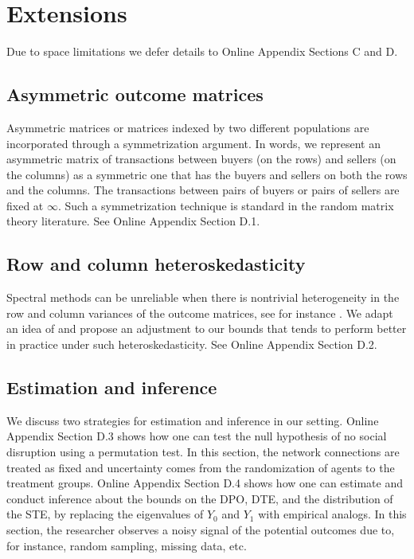 \documentclass[12pt]{article}
\theoremstyle{definition}
\begin{document}
\section{Extensions}
Due to space limitations we defer details to Online Appendix Sections C and D.   

\subsection{Asymmetric outcome matrices}
Asymmetric matrices or matrices indexed by two different populations are incorporated through a symmetrization argument. In words, we represent an asymmetric matrix of transactions between buyers (on the rows) and sellers (on the columns) as a symmetric one that has the buyers and sellers on both the rows and the columns. The transactions between pairs of buyers or pairs of sellers are fixed at $\infty$. Such a symmetrization technique is standard in the random matrix theory literature. See Online Appendix Section D.1.  

\subsection{Row and column heteroskedasticity}
Spectral methods can be unreliable when there is nontrivial heterogeneity in the row and column variances of the outcome matrices, see for instance \cite{auerbach2022testing}. We adapt an idea of \cite{finke1987quadratic} and propose an adjustment to our bounds that tends to perform better in practice under such heteroskedasticity. See Online Appendix  Section D.2.  


\subsection{Estimation and inference}
We discuss two strategies for estimation and inference in our setting. Online Appendix Section D.3 shows how one can test the null hypothesis of no social disruption using a permutation test. In this section, the network connections are treated as fixed and uncertainty comes from the randomization of agents to the treatment groups. Online Appendix Section D.4 shows how one can estimate and conduct inference about the bounds on the DPO, DTE, and the distribution of the STE, by replacing the eigenvalues of $Y_{0}$ and $Y_{1}$ with empirical analogs. In this section, the researcher observes a noisy signal of the potential outcomes due to, for instance, random sampling, missing data, etc.    
\end{document}
